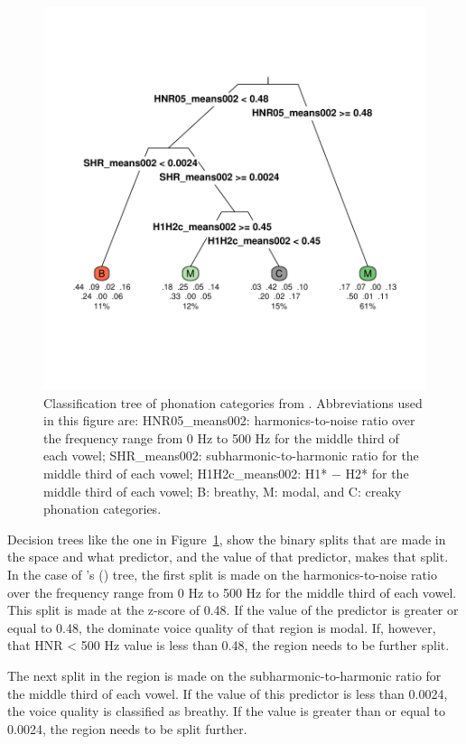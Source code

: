 \begin{figure}[!ht]
    \centering
    \includegraphics[width = 0.9\linewidth]{images/keating_tree.pdf}
    \caption{Classification tree of phonation categories from \citet{keatingCrosslanguageAcousticSpace2023}. Abbreviations used in this figure are: {HNR05_means002}: harmonics-to-noise ratio over the frequency range from 0 Hz to 500 Hz for the middle third of each vowel; {SHR_means002}: subharmonic-to-harmonic ratio for the middle third of each vowel; {H1H2c_means002}: H1* − H2* for the middle third of each vowel; B: breathy, M: modal, and C: creaky phonation categories.}
    \label{fig:keating_tree}
\end{figure}

Decision trees like the one in Figure~\ref{fig:keating_tree}, show the binary splits that are made in the space and what predictor, and the value of that predictor, makes that split. In the case of \citeauthor{keatingCrosslanguageAcousticSpace2023}'s (\citeyear{keatingCrosslanguageAcousticSpace2023}) tree, the first split is made on the harmonics-to-noise ratio over the frequency range from 0 Hz to 500 Hz for the middle third of each vowel. This split is made at the z-score of 0.48. If the value of the predictor is greater or equal to 0.48, the dominate voice quality of that region is modal. If, however, that HNR < 500 Hz value is less than 0.48, the region needs to be further split. 

The next split in the region is made on the subharmonic-to-harmonic ratio for the middle third of each vowel. If the value of this predictor is less than 0.0024, the voice quality is classified as breathy. If the value is greater than or equal to 0.0024, the region needs to be split further.


